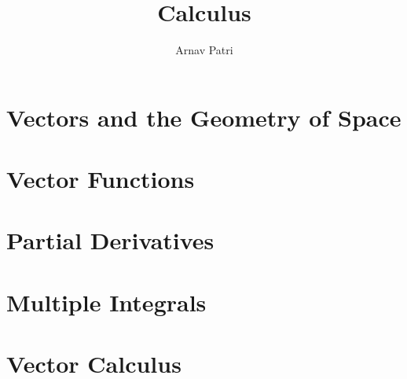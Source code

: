 \documentclass[12pt, A4]{report}
\title{Calculus \Roman{3}}
\author{Arnav Patri}
\begin{document}
	\maketitle
	\tableofcontents
	\setcounter{chapter}{11}
		\chapter{Vectors and the Geometry of Space}
			
		\chapter{Vector Functions}
			
		\chapter{Partial Derivatives}
			
		\chapter{Multiple Integrals}
			
		\chapter{Vector Calculus}
			
\end{document}
